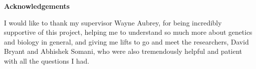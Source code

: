 \thispagestyle{empty}

\begin{center}
    {\LARGE\bf Acknowledgements}
\end{center}

I would like to thank my supervisor Wayne Aubrey, for being incredibly supportive of this project, helping me to understand so much more about genetics and biology in general, and giving me lifts to go and meet the researchers, David Bryant and Abhishek Somani, who were also tremendously helpful and patient with all the questions I had. 
